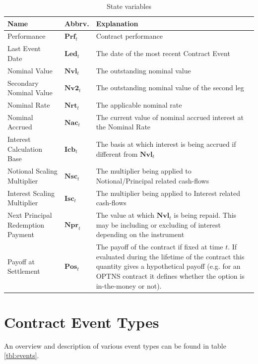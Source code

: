 \documentclass[9pt,oneside]{amsart}
\newcommand{\svar}[2]{\textbf{#1}_{#2}}
\begin{document}
\begin{multicols}{2}
\begin{table}[H]
	\centering
	\begin{tabular}{| p{0.8in}p{0.3in}p{1.8in} |}
	\hline
	\textbf{Name} & \textbf{Abbrv.} & \textbf{Explanation} \\
	\hline
	Performance & $\svar{Prf}{t}$ & Contract performance \\	
	\hline
	Last Event Date & $\svar{Led}{t}$ & The date of the most recent Contract Event \\
	\hline
	Nominal Value & $\svar{Nvl}{t}$ & The outstanding nominal value \\
	\hline
	Secondary Nominal Value & $\svar{Nv2}{t}$ & The outstanding nominal value of the second leg \\
	\hline
	Nominal Rate & $\svar{Nrt}{t}$ & The applicable nominal rate \\
	\hline
	Nominal Accrued & $\svar{Nac}{t}$ & The current value of nominal accrued interest at the Nominal Rate \\
	\hline
	Interest Calculation Base & $\svar{Icb}{t}$ & The basis at which interest is being accrued if different from $\svar{Nvl}{t}$ \\
	\hline
	Notional Scaling Multiplier & $\svar{Nsc}{t}$ & The multiplier being applied to Notional/Principal related
	cash-flows \\
	\hline
	Interest Scaling Multiplier & $\svar{Isc}{t}$ & The multiplier being applied to Interest related cash-flows \\
	\hline
	Next Principal Redemption Payment & $\svar{Npr}{t}$ & The value at which $\svar{Nvl}{t}$ is being repaid. This may be including or excluding of interest depending on the instrument\\
	\hline
	Payoff at Settlement & $\svar{Pos}{t}$ & The payoff of the contract if fixed at time $t$. If evaluated during the lifetime of the contract this quantity gives a hypothetical payoff (e.g. for an OPTNS contract it defines whether the option is in-the-money or not).\\
	\hline
	\end{tabular}
	\caption{State variables}
	\label{tbl:statevars}
\end{table}




\section{Contract Event Types}\label{sec:events}

An overview and description of various event types can be found in table \ref{tbl:events}. 

\end{multicols}
\end{document}
